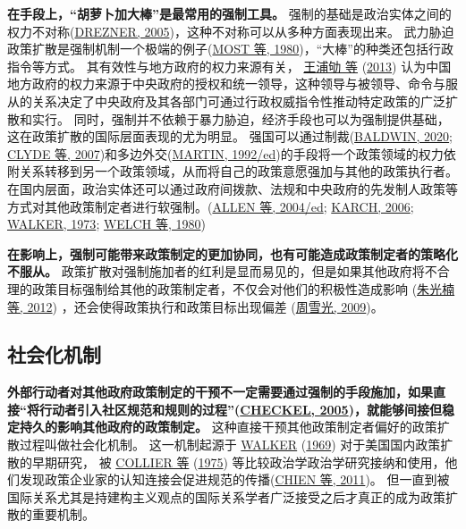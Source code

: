 \documentclass[
  12pt,
]{ctexart}
\begin{document}
\textbf{在手段上，``胡萝卜加大棒''是最常用的强制工具。}
强制的基础是政治实体之间的权力不对称(\protect\hyperlink{ref-Drezner2005}{DREZNER, 2005})，这种不对称可以从多种方面表现出来。
武力胁迫政策扩散是强制机制一个极端的例子(\protect\hyperlink{ref-MostStarr1980a}{MOST 等, 1980})，``大棒''的种类还包括行政指令等方式。
其有效性与地方政府的权力来源有关， \protect\hyperlink{ref-WangPuQuLaiXianJin2013}{王浦劬 等} (\protect\hyperlink{ref-WangPuQuLaiXianJin2013}{2013}) 认为中国地方政府的权力来源于中央政府的授权和统一领导，这种领导与被领导、命令与服从的关系决定了中央政府及其各部门可通过行政权威指令性推动特定政策的广泛扩散和实行。
同时，强制并不依赖于暴力胁迫，经济手段也可以为强制提供基础，这在政策扩散的国际层面表现的尤为明显。
强国可以通过制裁(\protect\hyperlink{ref-Baldwin2020}{BALDWIN, 2020}; \protect\hyperlink{ref-ClydeEtAl2007}{CLYDE 等, 2007})和多边外交(\protect\hyperlink{ref-Martin1992}{MARTIN, 1992/ed})的手段将一个政策领域的权力依附关系转移到另一个政策领域，从而将自己的政策意愿强加与其他的政策执行者。
在国内层面，政治实体还可以通过政府间拨款、法规和中央政府的先发制人政策等方式对其他政策制定者进行软强制。(\protect\hyperlink{ref-AllenEtAl2004}{ALLEN 等, 2004/ed}; \protect\hyperlink{ref-Karch2006}{KARCH, 2006}; \protect\hyperlink{ref-Walker1973}{WALKER, 1973}; \protect\hyperlink{ref-WelchThompson1980}{WELCH 等, 1980})

\textbf{在影响上，强制可能带来政策制定的更加协同，也有可能造成政策制定者的策略化不服从。}
政策扩散对强制施加者的红利是显而易见的，但是如果其他政府将不合理的政策目标强制给其他的政策制定者，不仅会对他们的积极性造成影响 (\protect\hyperlink{ref-ZhuGuangNanEtAl2012a}{朱光楠 等, 2012}) ，还会使得政策执行和政策目标出现偏差 (\protect\hyperlink{ref-ZhouXueGuang2009a}{周雪光, 2009})。

\hypertarget{ux793eux4f1aux5316ux673aux5236}{%
\subsection{社会化机制}\label{ux793eux4f1aux5316ux673aux5236}}

\textbf{外部行动者对其他政府政策制定的干预不一定需要通过强制的手段施加，如果直接``将行动者引入社区规范和规则的过程''(\protect\hyperlink{ref-Checkel2005}{CHECKEL, 2005})，就能够间接但稳定持久的影响其他政府的政策制定。}
这种直接干预其他政策制定者偏好的政策扩散过程叫做社会化机制。
这一机制起源于 \protect\hyperlink{ref-Walker1969}{WALKER} (\protect\hyperlink{ref-Walker1969}{1969}) 对于美国国内政策扩散的早期研究，
被 \protect\hyperlink{ref-CollierMessick1975}{COLLIER 等} (\protect\hyperlink{ref-CollierMessick1975}{1975}) 等比较政治学政治学研究接纳和使用，他们发现政策企业家的认知连接会促进规范的传播(\protect\hyperlink{ref-CHIENHo2011}{CHIEN 等, 2011})。
但一直到被国际关系尤其是持建构主义观点的国际关系学者广泛接受之后才真正的成为政策扩散的重要机制。
\end{document}
